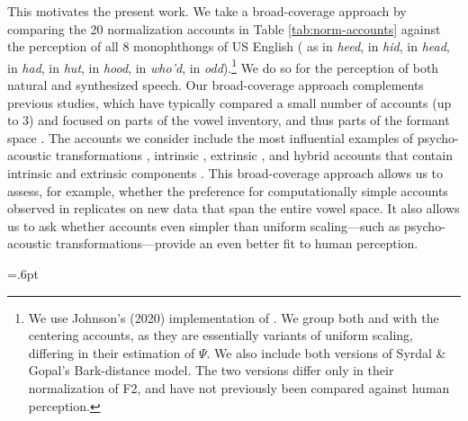 \documentclass[preprint]{JASA}
\begin{document}
This motivates the present work. We take a broad-coverage approach by comparing the 20 normalization accounts in Table \ref{tab:norm-accounts} against the perception of all 8 monophthongs of US English (\ipatext{[i]} as in \emph{heed}, \ipatext{[ɪ]} in \emph{hid}, \ipatext{[ɛ]} in \emph{head}, \ipatext{[æ]} in \emph{had}, \ipatext{[ʌ]} in \emph{hut}, \ipatext{[ʊ]} in \emph{hood}, \ipatext{[u]} in \emph{who'd}, \ipatext{[ɑ]} in \emph{odd}).\footnote{We use Johnson's (2020) implementation of \citet{nordstrom-lindblom1975}. We group both \citet{nordstrom-lindblom1975} and \citet{johnson2020} with the centering accounts, as they are essentially variants of uniform scaling, differing in their estimation of \(\Psi\). We also include both versions of Syrdal \& Gopal's Bark-distance model. The two versions differ only in their normalization of F2, and have not previously been compared against human perception.} We do so for the perception of both natural and synthesized speech. Our broad-coverage approach complements previous studies, which have typically compared a small number of accounts (up to 3) and focused on parts of the vowel inventory, and thus parts of the formant space \citep[typically 2-4 vowels,][]{barreda-nearey2012, barreda2021, nearey1989, richter2017}. The accounts we consider include the most influential examples of psycho-acoustic transformations \citep{glasberg-moore1990, fant2002, stevens-volkmann1940, traunmuller1981}, intrinsic \citep{syrdal-gopal1986}, extrinsic \citep{gerstman1968, johnson2020, lobanov1971, mcmurray-jongman2011, nearey1978, nordstrom-lindblom1975}, and hybrid accounts that contain intrinsic and extrinsic components \citep{miller1989}. This broad-coverage approach allows us to assess, for example, whether the preference for computationally simple accounts observed in \citet{barreda2021} replicates on new data that span the entire vowel space. It also allows us to ask whether accounts even simpler than uniform scaling---such as psycho-acoustic transformations---provide an even better fit to human perception.

\clearpage

\tabcolsep=.6pt

\def\xrotatetable{\clearpage
\nolinenumbers
\setbox0=\vbox to\textwidth\bgroup\hsize=.5\textheight
\leftskip=0pt
\let\footnotemark\tablefootnotemark
\let\footnotetext\tablefootnotetext
\parindent=0pt
\vskip3pt}

\def\endxrotatetable{\egroup
\nolinenumbers
\noindent\hskip-40pt\rotatebox{90}{\vbox{\unvbox0\vfill}}
\clearpage}
\end{document}
